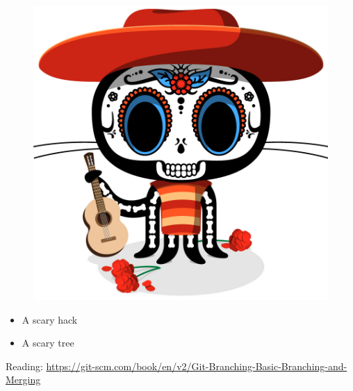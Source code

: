 \documentclass[]{book}
\theoremstyle{definition}
\theoremstyle{definition}
\theoremstyle{definition}
\theoremstyle{remark}
\begin{document}
\begin{figure}

{\centering \includegraphics[width=12.44in]{images/ch3_octocat-de-los-muertos} 

}

\end{figure}

\begin{itemize}
\item
  A scary hack
\item
  A scary tree
\end{itemize}

Reading:
\url{https://git-scm.com/book/en/v2/Git-Branching-Basic-Branching-and-Merging}
\end{document}
